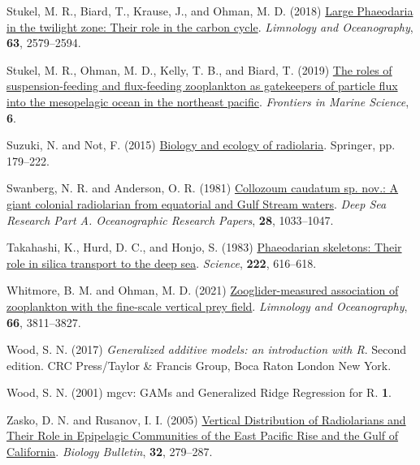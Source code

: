 \documentclass[
]{article}
\newlength{\cslhangindent}
\newlength{\cslentryspacingunit} %
\newenvironment{CSLReferences}[2] %
 {%
  \setlength{\parindent}{0pt}
  \ifodd #1
  \let\oldpar\par
  \def\par{\hangindent=\cslhangindent\oldpar}
  \fi
  \setlength{\parskip}{#2\cslentryspacingunit}
 }%
 {}
\begin{document}
\begin{CSLReferences}{1}{0}
\leavevmode{}%
Stukel, M. R., Biard, T., Krause, J., and Ohman, M. D. (2018)
\href{https://doi.org/10.1002/lno.10961}{Large Phaeodaria in the
twilight zone: Their role in the carbon cycle}. \emph{Limnology and
Oceanography}, \textbf{63}, 2579--2594.

\leavevmode{}%
Stukel, M. R., Ohman, M. D., Kelly, T. B., and Biard, T. (2019)
\href{https://www.frontiersin.org/articles/10.3389/fmars.2019.00397}{The
roles of suspension-feeding and flux-feeding zooplankton as gatekeepers
of particle flux into the mesopelagic ocean in the northeast pacific}.
\emph{Frontiers in Marine Science}, \textbf{6}.

\leavevmode{}%
Suzuki, N. and Not, F. (2015)
\href{https://link.springer.com/chapter/10.1007/978-4-431-55130-0_8}{Biology
and ecology of radiolaria}. Springer, pp. 179--222.

\leavevmode{}%
Swanberg, N. R. and Anderson, O. R. (1981)
\href{https://doi.org/10.1016/0198-0149(81)90016-9}{Collozoum caudatum
sp. nov.: A giant colonial radiolarian from equatorial and Gulf Stream
waters}. \emph{Deep Sea Research Part A. Oceanographic Research Papers},
\textbf{28}, 1033--1047.

\leavevmode{}%
Takahashi, K., Hurd, D. C., and Honjo, S. (1983)
\href{https://doi.org/10.1126/science.222.4624.616}{Phaeodarian
skeletons: Their role in silica transport to the deep sea}.
\emph{Science}, \textbf{222}, 616--618.

\leavevmode{}%
Whitmore, B. M. and Ohman, M. D. (2021)
\href{https://doi.org/10.1002/lno.11920}{Zooglider-measured association
of zooplankton with the fine-scale vertical prey field}. \emph{Limnology
and Oceanography}, \textbf{66}, 3811--3827.

\leavevmode{}%
Wood, S. N. (2017) \emph{Generalized additive models: an introduction
with R}. Second edition. CRC Press/Taylor \& Francis Group, Boca Raton
London New York.

\leavevmode{}%
Wood, S. N. (2001) mgcv: GAMs and Generalized Ridge Regression for R.
\textbf{1}.

\leavevmode{}%
Zasko, D. N. and Rusanov, I. I. (2005)
\href{https://doi.org/10.1007/s10525-005-0103-5}{Vertical Distribution
of Radiolarians and Their Role in Epipelagic Communities of the East
Pacific Rise and the Gulf of California}. \emph{Biology Bulletin},
\textbf{32}, 279--287.

\end{CSLReferences}
\end{document}
